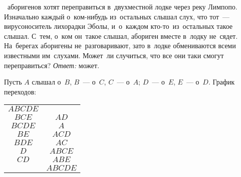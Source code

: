 ~аборигенов хотят переправиться в~двухместной лодке через реку Лимпопо.
Изначально каждый о~ком-нибудь из~остальных слышал слух, что тот~---
вирусоноситель лихорадки Эболы, и~о~каждом кто-то~из~остальных такое слышал.
С~тем, о~ком он~такое слышал, абориген вместе в~лодку не~сядет.
На~берегах аборигены не~разговаривают, зато в~лодке обмениваются всеми
известными им~слухами.
Может~ли случиться, что все они таки смогут переправиться? 
\solution
\emph{Ответ:} может.
\par
Пусть $A$ слышал о~$B$, $B$~--- о~$C$, $C$~--- о~$A$;
$D$~--- о~$E$, $E$~--- о~$D$.
График переходов:
\\
\begin{center}\begin{tabular}{|c|c|}
$ABCDE$ &    \\
$BCE$ & $AD$ \\
$BCDE$ & $A$ \\
$BE$ & $ACD$ \\
$BDE$ & $AC$ \\
$D$ & $ABCE$ \\
$CD$ & $ABE$ \\
   & $ABCDE$ \\
\end{tabular}\end{center}
\endproblem
